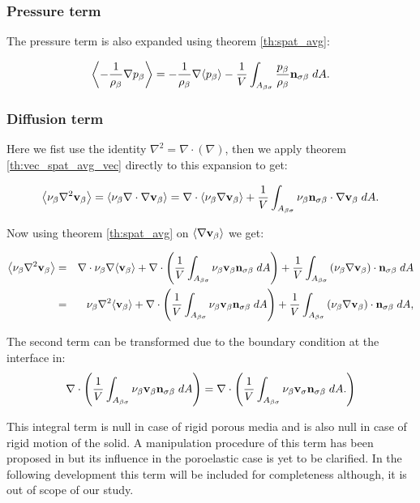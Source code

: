 \subsubsection{Pressure term}
The pressure term is also expanded using theorem \eqref{th:spat_avg}:

\begin{equation}
{\left< -\dfrac{1}{\rho_{\beta}} \nabla p_{\beta}\right>} = -\dfrac{1}{\rho_{\beta}} \nabla {\left< p_{\beta}\right>} -\dfrac{1}{V} \int_{A_{\beta \sigma}}  \dfrac{p_{\beta}}{\rho_{\beta}} \mathbf{n}_{\sigma \beta} \;dA.
\end{equation}

\subsubsection{Diffusion term}
Here we fist use the identity $\nabla^2 = \nabla \cdot (\nabla)$, then we apply theorem \eqref{th:vec_spat_avg_vec} directly to this expansion to get:

\begin{equation}
{\left< \nu_{\beta}\nabla^2 \textbf{v}_{\beta}\right>} = {\left< \nu_{\beta}\nabla \cdot \nabla \textbf{v}_{\beta} \right>} = \nabla \cdot {\left< \nu_{\beta}\nabla \textbf{v}_{\beta}\right>} +\dfrac{1}{V} \int_{A_{\beta \sigma}}  \nu_{\beta}   \mathbf{n}_{\sigma \beta} \cdot \nabla \textbf{v}_{\beta} \;dA.
\label{eq:4_1}
\end{equation}

\noindent Now using theorem \eqref{th:spat_avg} on ${\left< \nabla \textbf{v}_{\beta} \right>}$ we get:

\begin{eqnarray}
	{\left< \nu_{\beta}\nabla^2 \textbf{v}_{\beta}\right>} &=& \nabla \cdot \nu_{\beta} \nabla {\left< \textbf{v}_{\beta}\right>} + \nabla \cdot \left( \dfrac{1}{V} \int_{A_{\beta \sigma}}  \nu_{\beta} \textbf{v}_{\beta}  \mathbf{n}_{\sigma \beta} \;dA \right) + \dfrac{1}{V} \int_{A_{\beta \sigma}} \left( \nu_{\beta} \nabla \textbf{v}_{\beta} \right) \cdot \mathbf{n}_{\sigma \beta} \;dA  \nonumber \\
	&=& \nu_{\beta}\nabla^2 {\left< \textbf{v}_{\beta} \right>} +  \nabla \cdot \left( \dfrac{1}{V} \int_{A_{\beta \sigma}}  \nu_{\beta} \textbf{v}_{\beta} \mathbf{n}_{\sigma \beta} \;dA \right) + \dfrac{1}{V} \int_{A_{\beta \sigma}} \left( \nu_{\beta} \nabla \textbf{v}_{\beta} \right) \cdot \mathbf{n}_{\sigma \beta} \;dA,   \nonumber
\end{eqnarray}

The second term can be transformed due to the boundary condition at the interface in:
$$
\nabla \cdot \left( \dfrac{1}{V} \int_{A_{\beta \sigma}}  \nu_{\beta} \textbf{v}_{\beta} \mathbf{n}_{\sigma \beta} \;dA \right) = \nabla \cdot \left( \dfrac{1}{V} \int_{A_{\beta \sigma}}  \nu_{\beta} \textbf{v}_{\sigma} \mathbf{n}_{\sigma \beta} \;dA. \right)
$$

\noindent This integral term is null in case of rigid porous media and is also null in case of rigid motion of the solid. A manipulation procedure of this term has been proposed in \citet{hussong2011continuum} but its influence in the poroelastic case is yet to be clarified. In the following development this term will be included for completeness although, it is out of scope of our study.

